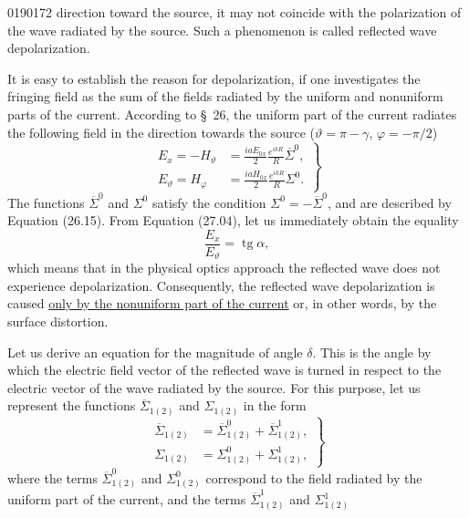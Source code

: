 \begin{scanpage}{0190}{172}
direction toward the source, it may not coincide with the polarization of the wave radiated by the source. Such a phenomenon is called reflected wave depolarization.

It is easy to establish the reason for depolarization, if one investigates the fringing field as the sum of the fields radiated by the uniform and nonuniform parts of the current. According to \S~26, the uniform part of the current radiates the following field in the direction towards the source ($\vartheta=\pi-\gamma$, $\varphi=-\pi/2$)
\[
\left.\begin{aligned}E_x=-H_\vartheta&=\frac{iaE_{0x}}2\frac{e^{ikR}}R\overline\Sigma^0,\\
E_\vartheta=H_\varphi&=\frac{iaH_{0x}}2\frac{e^{ikR}}R\Sigma^0.
\end{aligned}\right\}\tag{27.04}
\]
The functions $\overline\Sigma^0$ and $\Sigma^0$ satisfy the condition $\Sigma^0=-\overline\Sigma^0$, and are described by Equation (26.15). From Equation (27.04), let us immediately obtain the equality
\[
\frac{E_x}{E_\vartheta}=\operatorname{tg}\alpha,\tag{27.05}
\]
which means that in the physical optics approach the reflected wave does not experience depolarization. Consequently, the reflected wave depolarization is caused \underline{only by the nonuniform part of the current} or, in other words, by the surface distortion.

Let us derive an equation for the magnitude of angle $\delta$. This is the angle by which the electric field vector of the reflected wave is turned in respect to the electric vector of the wave radiated by the source. For this purpose, let us represent the functions $\overline\Sigma_{1(2)}$ and $\Sigma_{1(2)}$ in the form
\[
\left.\begin{aligned}\overline\Sigma_{1(2)}&=\overline\Sigma^0_{1(2)}+\overline\Sigma^1_{1(2)},\\
\Sigma_{1(2)}&=\Sigma^0_{1(2)}+\Sigma^1_{1(2)},
\end{aligned}\right\}\tag{27.06}
\]
where the terms $\overline\Sigma^0_{1(2)}$ and $\Sigma^0_{1(2)}$ correspond to the field radiated by the uniform part of the current, and the terms $\overline\Sigma^1_{1(2)}$ and $\Sigma^1_{1(2)}$
\end{scanpage}
